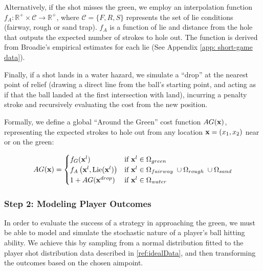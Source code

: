 \documentclass[11pt, letterpaper]{article}
\begin{document}
Alternatively, if the shot misses the green, we employ an interpolation function $f_A: \mathbb{R}^+ \times \mathcal{C} \to \mathbb{R}^+$, where $\mathcal{C} = \{F, R, S\}$ represents the set of lie conditions (fairway, rough or sand trap). $f_A$ is a function of lie and distance from the hole that outputs the expected number of strokes to hole out. The function is derived from Broadie's empirical estimates for each lie (See Appendix \ref{app: short-game data}).

Finally, if a shot lands in a water hazard, we simulate a ``drop'' at the nearest point of relief (drawing a direct line from the ball's starting point, and acting as if that the ball landed at the first intersection with land), incurring a penalty stroke and recursively evaluating the cost from the new position.

Formally, we define a global ``Around the Green'' cost function $AG(\mathbf{x})$, representing the expected strokes to hole out from any location $\mathbf{x} = (x_1, x_2)$ near or on the green:

\begin{equation}
\label{eq: AG}
    AG(\mathbf{x}) = \begin{cases}
    f_G(\mathbf{x}^l)& \text{if } \mathbf{x}^l \in \Omega_{green} \\
    f_A\left(\mathbf{x}^l, \text{Lie}(\mathbf{x}^l)\right) & \text{if } \mathbf{x}^l \in \Omega_{fairway}\; \cup \Omega_{rough} \; \cup \Omega_{sand}  \\
    1 + AG(\mathbf{x}^{drop}) & \text{if } \mathbf{x}^l \in \Omega_{water}
\end{cases}
\end{equation}

\subsubsection{Step 2: Modeling Player Outcomes}
\label{subsec: playerSim}
In order to evaluate the success of a strategy in approaching the green, we must be able to model and simulate the stochastic nature of a player's ball hitting ability. We achieve this by sampling from a normal distribution fitted to the player shot distribution data described in \ref{ref:idealData}, and then transforming the outcomes based on the chosen aimpoint.
\end{document}
